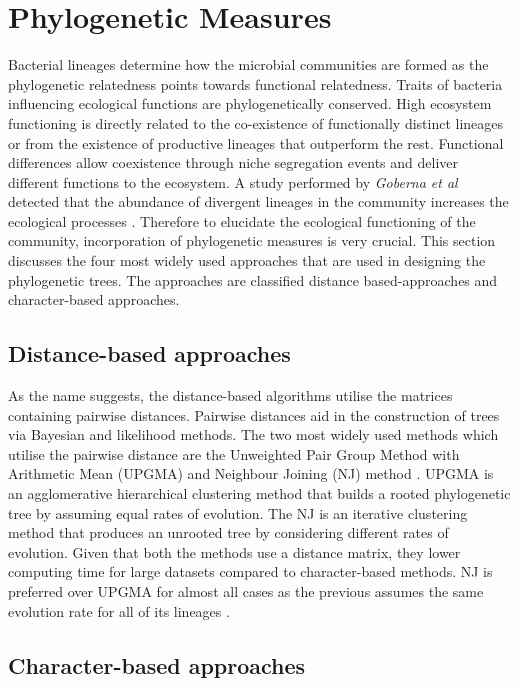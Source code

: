 \chapter{Phylogenetic Measures}
 \setcounter{page}{16}

Bacterial lineages determine how the microbial communities are formed as the phylogenetic relatedness points towards functional relatedness. Traits of bacteria influencing ecological functions are phylogenetically conserved. High ecosystem functioning is directly related to the co-existence of functionally distinct lineages or from the existence of productive lineages that outperform the rest. Functional differences allow coexistence through niche segregation events and deliver different functions to the ecosystem. A study performed by \emph{Goberna et al} detected that the abundance of divergent lineages in the community increases the ecological processes \cite{goberna_2018_phylogeneticscale}. Therefore to elucidate the ecological functioning of the community, incorporation of phylogenetic measures is very crucial. This section discusses the four most widely used approaches that are used in designing the phylogenetic trees. The approaches are classified distance based-approaches and character-based approaches.

\section{Distance-based approaches}

As the name suggests, the distance-based algorithms utilise the matrices containing pairwise distances. Pairwise distances aid in the construction of trees via Bayesian and likelihood methods. The two most widely used methods which utilise the pairwise distance are the Unweighted Pair Group Method with Arithmetic Mean (UPGMA) and Neighbour Joining (NJ) method \cite{munjal_2019_phylogenetics}. UPGMA is an agglomerative hierarchical clustering method that builds a rooted phylogenetic tree by assuming equal rates of evolution. The NJ is an iterative clustering method that produces an unrooted tree by considering different rates of evolution. Given that both the methods use a distance matrix, they lower computing time for large datasets compared to character-based methods. NJ is preferred over UPGMA for almost all cases as the previous assumes the same evolution rate for all of its lineages \cite{munjal_2019_phylogenetics}.

\section{Character-based approaches}


